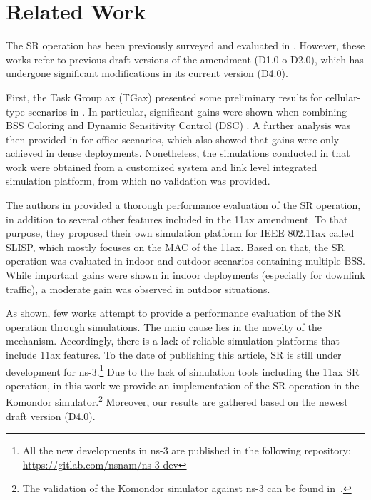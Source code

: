 \documentclass{article}
\begin{document}
	\section{Related Work}
	\label{section:related_work}
	
	The SR operation has been previously surveyed and evaluated in \cite{bellalta2016ieee,khorov2018tutorial,sr_evaluation_1,sr_evaluation_3,sr_evaluation_2}. However, these works refer to previous draft versions of the amendment (D1.0 o D2.0), which has undergone significant modifications in its current version (D4.0).

	First, the Task Group ax (TGax) presented some preliminary results for cellular-type scenarios in \cite{sr_evaluation_1}. In particular, significant gains were shown when combining BSS Coloring and Dynamic Sensitivity Control (DSC) \cite{smith2017dynamic}. A further analysis was then provided in \cite{sr_evaluation_3} for office scenarios, which also showed that gains were only achieved in dense deployments. Nonetheless, the simulations conducted in that work were obtained from a customized system and link level integrated simulation platform, from which no validation was provided.
	
	The authors in \cite{sr_evaluation_2} provided a thorough performance evaluation of the SR operation, in addition to several other features included in the 11ax amendment. To that purpose, they proposed their own simulation platform for IEEE 802.11ax called SLISP, which mostly focuses on the MAC of the 11ax. Based on that, the SR operation was evaluated in indoor and outdoor scenarios containing multiple BSS. While important gains were shown in indoor deployments (especially for downlink traffic), a moderate gain was observed in outdoor situations.
	
	As shown, few works attempt to provide a performance evaluation of the SR operation through simulations. The main cause lies in the novelty of the mechanism. Accordingly, there is a lack of reliable simulation platforms that include 11ax features. To the date of publishing this article, SR is still under development for ns-3.\footnote{All the new developments in ns-3 are published in the following repository: \url{https://gitlab.com/nsnam/ns-3-dev}} Due to the lack of simulation tools including the 11ax SR operation, in this work we provide an implementation of the SR operation in the Komondor simulator.\footnote{The validation of the Komondor simulator against ns-3 can be found in~\cite{komondor}.} Moreover, our results are gathered based on the newest draft version (D4.0).
	
\end{document}
